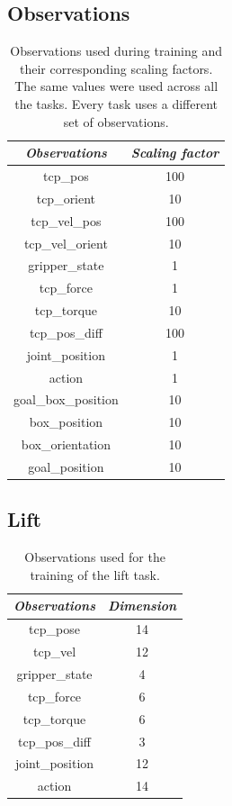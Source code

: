 \documentclass[letterpaper, 10 pt, conference]{ieeeconf}  %
\begin{document}
\subsection{Observations}
\begin{table}[H]
    \centering
    \renewcommand{\arraystretch}{1.5}
    \caption{Observations used during training and their corresponding scaling factors. The same values were used across all the tasks. Every task uses a different set of observations.}
    \begin{tabular}{c|c}
    \toprule \textit{\textbf{Observations}} & \textit{\textbf{Scaling factor}}\\
    \midrule tcp\_pos & 100 \\
    tcp\_orient & 10 \\
    tcp\_vel\_pos & 100\\
    tcp\_vel\_orient & 10\\
    gripper\_state & 1\\
    tcp\_force & 1\\
    tcp\_torque & 10\\
    tcp\_pos\_diff & 100\\
    joint\_position & 1\\
    action & 1\\
    goal\_box\_position & 10\\
    box\_position & 10\\
    box\_orientation & 10\\
    goal\_position & 10\\
    \bottomrule
    \end{tabular}
    \label{scaling_factors}
\end{table}

\subsection{Lift}

\begin{table}[H]
    \centering
    \caption{Observations used for the training of the lift task.}
    \renewcommand{\arraystretch}{1.5}
    \begin{tabular}{c|c}
    \toprule \textit{\textbf{Observations}} & \textit{\textbf{Dimension}}\\
    \midrule tcp\_pose & 14 \\
    tcp\_vel & 12 \\
    gripper\_state & 4 \\
    tcp\_force & 6\\
    tcp\_torque & 6\\
    tcp\_pos\_diff & 3\\
    joint\_position & 12\\
    action & 14 \\
    \bottomrule
    \end{tabular}
    \label{lift_obs}
\end{table}
\end{document}
